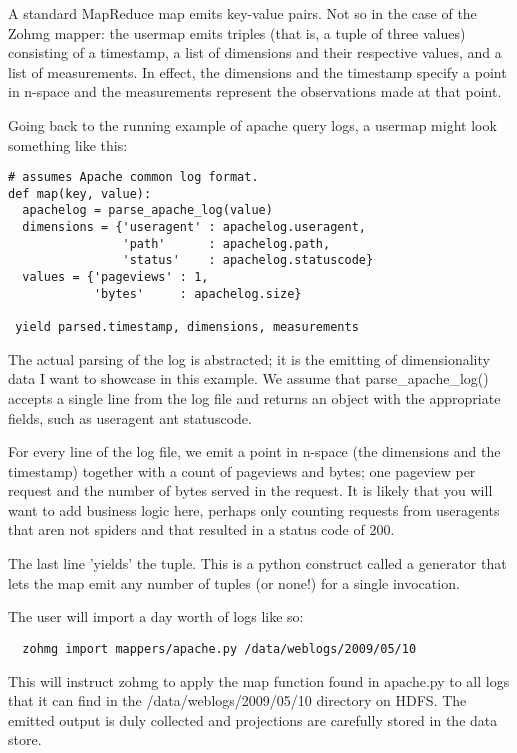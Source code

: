 \documentclass[a4paper,10pt]{book}
\begin{document}
A standard MapReduce map emits key-value pairs. Not so in the case of the
Zohmg mapper: the usermap emits triples (that is, a tuple of three values)
consisting of a timestamp, a list of dimensions and their respective values,
and a list of measurements. In effect, the dimensions and the timestamp
specify a point in n-space and the measurements represent the observations
made at that point.

Going back to the running example of apache query logs, a usermap might look
something like this:

\begin{verbatim}
# assumes Apache common log format.
def map(key, value):
  apachelog = parse_apache_log(value)
  dimensions = {'useragent' : apachelog.useragent,
                'path'      : apachelog.path,
                'status'    : apachelog.statuscode}
  values = {'pageviews' : 1,
            'bytes'     : apachelog.size}
 
 yield parsed.timestamp, dimensions, measurements
\end{verbatim}

The actual parsing of the log is abstracted; it is the emitting of
dimensionality data I want to showcase in this example. We assume that
parse\_apache\_log() accepts a single line from the log file and returns an
object with the appropriate fields, such as useragent ant statuscode.

For every line of the log file, we emit a point in n-space (the dimensions and
the timestamp) together with a count of pageviews and bytes; one pageview per
request and the number of bytes served in the request. It is likely that you
will want to add business logic here, perhaps only counting requests from
useragents that aren not spiders and that resulted in a status code of 200.

The last line 'yields' the tuple. This is a python construct called a
generator that lets the map emit any number of tuples (or none!) for a single
invocation.

The user will import a day worth of logs like so:

\begin{verbatim}
  zohmg import mappers/apache.py /data/weblogs/2009/05/10
\end{verbatim}

This will instruct zohmg to apply the map function found in apache.py to all
logs that it can find in the /data/weblogs/2009/05/10 directory on HDFS. The
emitted output is duly collected and projections are carefully stored in the
data store.
\end{document}
